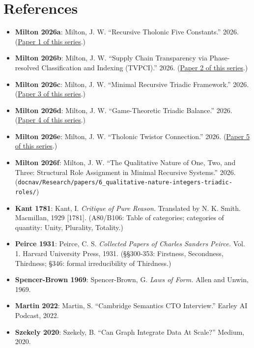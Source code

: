 \documentclass[12pt]{article}
\providecommand{\tightlist}{%
  \setlength{\itemsep}{0pt}\setlength{\parskip}{0pt}}
\begin{document}
\section{References}\label{references}

\begin{itemize}
\tightlist
\item
  \textbf{Milton 2026a}: Milton, J. W. ``Recursive Tholonic Five
  Constants.'' 2026.
  (\href{https://github.com/baardev/truevalue/blob/main/docnav/Research/papers/1_recursive-tholonic-five-constants/1_recursive-tholonic-five-constants.pdf}{Paper
  1 of this series}.)
\item
  \textbf{Milton 2026b}: Milton, J. W. ``Supply Chain Transparency via
  Phase-resolved Classification and Indexing (TVPCI).'' 2026.
  (\href{https://github.com/baardev/truevalue/blob/main/docnav/Research/papers/2_supply-chain-transparency-tvpci/2_supply-chain-transparency-tvpci.pdf}{Paper
  2 of this series}.)
\item
  \textbf{Milton 2026c}: Milton, J. W. ``Minimal Recursive Triadic
  Framework.'' 2026.
  (\href{https://github.com/baardev/truevalue/blob/main/docnav/Research/papers/3_minimal-recursive-triadic-framework/3_minimal-recursive-triadic-framework.pdf}{Paper
  3 of this series}.)
\item
  \textbf{Milton 2026d}: Milton, J. W. ``Game-Theoretic Triadic
  Balance.'' 2026.
  (\href{https://github.com/baardev/truevalue/blob/main/docnav/Research/papers/4_game-theoretic-triadic-balance/4_game-theoretic-triadic-balance.pdf}{Paper
  4 of this series}.)
\item
  \textbf{Milton 2026e}: Milton, J. W. ``Tholonic Twistor Connection.''
  2026.
  (\href{https://github.com/baardev/truevalue/blob/main/docnav/Research/papers/5_tholonic-twistor-connection/5_tholonic-twistor-connection.pdf}{Paper
  5 of this series}.)
\item
  \textbf{Milton 2026f}: Milton, J. W. ``The Qualitative Nature of One,
  Two, and Three: Structural Role Assignment in Minimal Recursive
  Systems.'' 2026.
  (\texttt{docnav/Research/papers/6\_qualitative-nature-integers-triadic-roles/})
\item
  \textbf{Kant 1781}: Kant, I. \emph{Critique of Pure Reason.}
  Translated by N. K. Smith. Macmillan, 1929 {[}1781{]}. (A80/B106:
  Table of categories; categories of quantity: Unity, Plurality,
  Totality.)
\item
  \textbf{Peirce 1931}: Peirce, C. S. \emph{Collected Papers of Charles
  Sanders Peirce.} Vol. 1. Harvard University Press, 1931. (§§300-353:
  Firstness, Secondness, Thirdness; §346: formal irreducibility of
  Thirdness.)
\item
  \textbf{Spencer-Brown 1969}: Spencer-Brown, G. \emph{Laws of Form.}
  Allen and Unwin, 1969.
\item
  \textbf{Martin 2022}: Martin, S. ``Cambridge Semantics CTO
  Interview.'' Earley AI Podcast, 2022.
\item
  \textbf{Szekely 2020}: Szekely, B. ``Can Graph Integrate Data At
  Scale?'' Medium, 2020.
\end{itemize}
\end{document}
